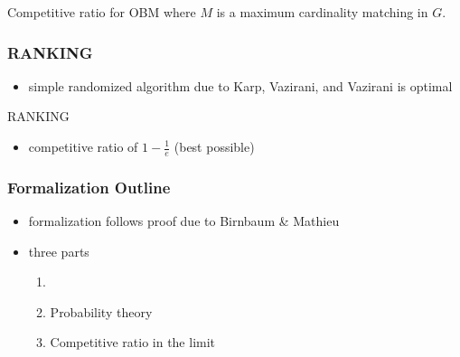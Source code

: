 \documentclass{beamer}
\DeclarePairedDelimiter\card{\lvert}{\rvert}
\begin{document}
\begin{frame}
\begin{columns}
\begin{column}{.3\textwidth}
    \end{column}
  \end{columns}
  \begin{block}{Competitive ratio for OBM}
    where $M$ is a maximum cardinality matching in $G$.
  \end{block}
\end{frame}

\begin{frame}
  \frametitle{RANKING}
  \onslide<+->
  \begin{itemize}
    \item simple randomized algorithm due to Karp, Vazirani, and Vazirani is optimal~\cite{karp1990}
  \end{itemize}
  \onslide<+->
  \begin{algorithm}[H]
  \small
  \DontPrintSemicolon
  \caption{RANKING}\label{alg:ranking}
  \Online{}
  \end{algorithm}
  \onslide<+->
  \begin{itemize}
    \item competitive ratio of $1 - \frac{1}{e}$ (best possible)
  \end{itemize}
\end{frame}

\begin{frame}
  \frametitle{Formalization Outline}
  \begin{itemize}[<+->]
    \item formalization follows proof due to Birnbaum \& Mathieu~\cite{birnbaum2008}
    \item three parts
    \begin{enumerate}
      \item {} 
      \item Probability theory
      \item Competitive ratio in the limit
    \end{enumerate}
  \end{itemize}
\end{frame}
\end{document}
